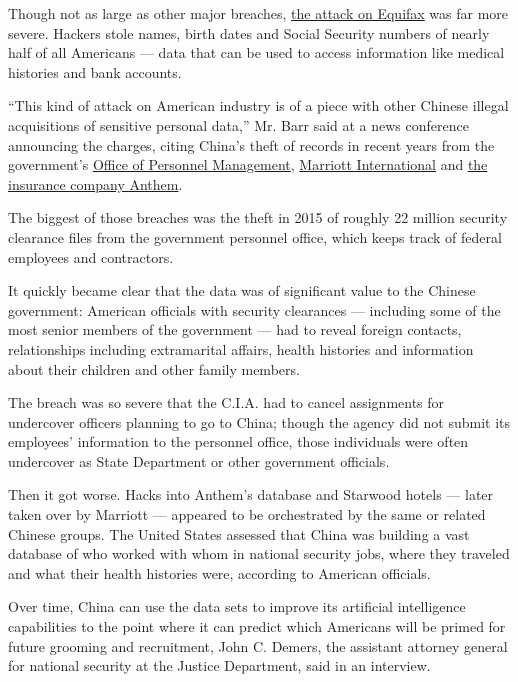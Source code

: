 Though not as large as other major breaches,
\href{https://www.nytimes.com/2017/09/07/business/equifax-cyberattack.html}{the
attack on Equifax} was far more severe. Hackers stole names, birth dates
and Social Security numbers of nearly half of all Americans --- data
that can be used to access information like medical histories and bank
accounts.

``This kind of attack on American industry is of a piece with other
Chinese illegal acquisitions of sensitive personal data,'' Mr. Barr said
at a news conference announcing the charges, citing China's theft of
records in recent years from the government's
\href{https://www.nytimes.com/2015/08/01/world/asia/us-decides-to-retaliate-against-chinas-hacking.html}{Office
of Personnel Management},
\href{https://www.nytimes.com/2019/01/04/us/politics/marriott-hack-passports.html}{Marriott
International} and
\href{https://www.nytimes.com/2019/05/09/technology/anthem-hack-indicted-breach.html}{the
insurance company Anthem}.

The biggest of those breaches was the theft in 2015 of roughly 22
million security clearance files from the government personnel office,
which keeps track of federal employees and contractors.

It quickly became clear that the data was of significant value to the
Chinese government: American officials with security clearances ---
including some of the most senior members of the government --- had to
reveal foreign contacts, relationships including extramarital affairs,
health histories and information about their children and other family
members.

The breach was so severe that the C.I.A. had to cancel assignments for
undercover officers planning to go to China; though the agency did not
submit its employees' information to the personnel office, those
individuals were often undercover as State Department or other
government officials.

Then it got worse. Hacks into Anthem's database and Starwood hotels ---
later taken over by Marriott --- appeared to be orchestrated by the same
or related Chinese groups. The United States assessed that China was
building a vast database of who worked with whom in national security
jobs, where they traveled and what their health histories were,
according to American officials.

Over time, China can use the data sets to improve its artificial
intelligence capabilities to the point where it can predict which
Americans will be primed for future grooming and recruitment, John C.
Demers, the assistant attorney general for national security at the
Justice Department, said in an interview.

